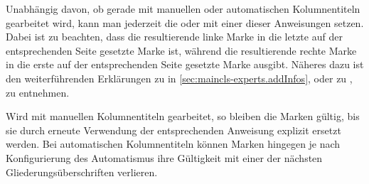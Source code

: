   \begin{Declaration}
  \end{Declaration}
  Unabhängig davon, ob gerade mit manuellen oder automatischen Kolumnentiteln
  gearbeitet wird, kann man jederzeit die  oder
   mit einer dieser Anweisungen setzen. Dabei ist zu
  beachten, dass die resultierende linke Marke in
   die letzte
  auf der entsprechenden Seite gesetzte Marke ist, während die resultierende
  rechte Marke in
   die erste
  auf der entsprechenden Seite gesetzte Marke ausgibt. Näheres dazu ist den
  weiterführenden Erklärungen zu  in
  \autoref{sec:maincls-experts.addInfos},
   oder zu
  ,
   zu entnehmen.

  Wird mit manuellen Kolumnentiteln gearbeitet,
  so bleiben die Marken gültig, bis sie durch erneute Verwendung der
  entsprechenden Anweisung explizit ersetzt werden. Bei automatischen
  Kolumnentiteln können Marken hingegen je nach Konfigurierung des
  Automatismus ihre Gültigkeit mit einer der nächsten Gliederungsüberschriften
  verlieren.

